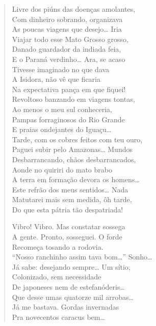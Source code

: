 {\begin{verse}
Livre dos piúns das doenças amolantes,\\
Com dinheiro sobrando, organizava\\
As poucas viagens que desejo\ldots{} Iria\\
Viajar todo esse Mato Grosso grosso,\\
Danado guardador da indiada feia,\\
E o Paraná verdinho\ldots{} Ara, se acaso\\
Tivesse imaginado no que dava\\
A Isidora, não vê que ficaria\\
Na expectativa pança em que fiquei!\\
Revoltoso banzando em viagens tontas,\\
Ao menos o meu sul conheceria,\\
Pampas forraginosos do Rio Grande\\
E praias ondejantes do Iguaçu\ldots{}\\
Tarde, com os cobres feitos com teu ouro,\\
Paguei subir pelo Amazonas\ldots{} Mundos\\
Desbarrancando, chãos desbarrancados,\\
Aonde no quiriri do mato brabo\\
A terra em formação devora os homens\ldots{}\\
Este refrão dos meus sentidos\ldots{} Nada\\
Matutarei mais sem medida, ôh tarde,\\
Do que esta pátria tão despatriada!

Vibro! Vibro. Mas constatar sossega\\
A gente. Pronto, sosseguei. O forde\\
Recomeça tosando a rodovia.\\
``Nosso ranchinho assim tava bom\ldots{}'' Sonho\ldots{}\\
Já sabe: desejando sempre\ldots{} Um sítio,\\
Colonizado, sem necessidade\\
De japoneses nem de estefanóderis\ldots{}\\
Que desse umas quatorze mil arrobas\ldots{}\\
Já me bastava. Gordas invernadas\\
Pra novecentos caracus bem\ldots{}


\end{verse}}
